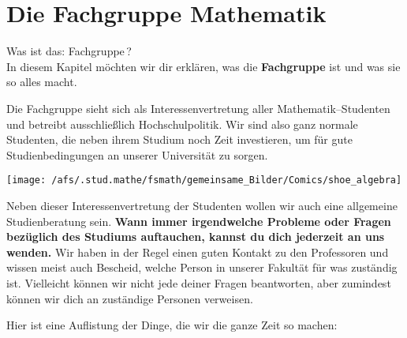 \section{Die Fachgruppe Mathematik}

Was ist das: Fachgruppe\,?\\

In diesem Kapitel möchten wir dir erklären,
was die {\bf Fachgruppe} ist und was sie so alles macht.

Die Fachgruppe sieht sich als Interessenvertretung
aller Mathematik--Studenten und
betreibt ausschließlich \glqq Hochschulpolitik\grqq .
Wir sind also ganz normale Studenten,
die neben ihrem Studium noch Zeit investieren,
um für gute Studienbedingungen an unserer Universität zu sorgen.
{
}
{
\begin{center}
\texttt{[image: /afs/.stud.mathe/fsmath/gemeinsame\_Bilder/Comics/shoe\_algebra]}
\end{center}
}

Neben dieser Interessenvertretung der Studenten
wollen wir auch eine allgemeine Studienberatung sein.
{\bf Wann immer irgendwelche Probleme oder Fragen
     bezüglich des Studiums auftauchen,
     kannst du dich jederzeit an uns wenden.} 
Wir haben in der Regel einen guten Kontakt zu den Professoren
und wissen meist auch Bescheid,
welche Person in unserer Fakultät für was zuständig ist.
Vielleicht können wir nicht jede deiner Fragen beantworten,
aber zumindest können wir dich an zuständige Personen verweisen.

Hier ist eine Auf\-listung der Dinge,
die wir die ganze Zeit so machen:

